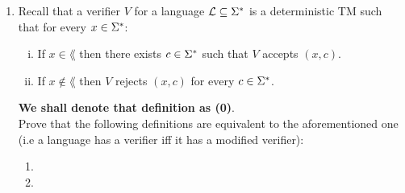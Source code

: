 \documentclass{article}
\begin{document}
\begin{enumerate}
          \pagebreak

    \item Recall that a verifier $V$ for a language $\mathcal{L} \subseteq \Sigma^*$ is a deterministic TM such
          that for every $x \in \Sigma^*$:
          \begin{enumerate}[(i)]
              \item If $x \in \lang$ then there exists $c \in \Sigma^*$ such that $V$ accepts $(x, c)$.
              \item If $x \notin \lang$ then $V$ rejects $(x, c)$ for every $c \in \Sigma^*$.
          \end{enumerate}
          \textbf{We shall denote that definition as (0)}.  \\
          Prove that the following definitions are equivalent to the aforementioned one
          (i.e a language has a verifier iff it has a modified verifier):

          \begin{enumerate}
              \item 
              \item 
          \end{enumerate}

\end{enumerate}
\end{document}

